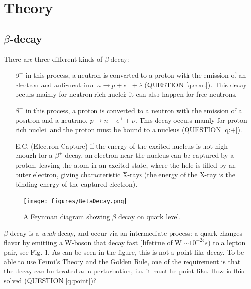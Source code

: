 \documentclass[a4,11pt, notitlepage]{article}
\begin{document}
\section{Theory}
\subsection{$\beta$-decay}

There are three different kinds of $\beta$ decay:
\begin{itemize}
\item[$\beta^-$] in this process, a neutron is converted to a proton with the emission of an electron and anti-neutrino, $n\rightarrow p + e^- + \bar \nu$ (QUESTION \ref{q:cont}). This decay occurs mainly for neutron rich nuclei; it can also happen for free neutrons.
\item[$\beta^+$] in this process, a proton is converted to a neutron with the emission of a positron and a neutrino, $p\rightarrow n + e^+ + \bar \nu$. This decay occurs mainly for proton rich nuclei, and the proton must be bound to a nucleus (QUESTION \ref{q:+}).
\item[E.C.] (Electron Capture) if the energy of the excited nucleus is not high enough for a $\beta^{\pm}$ decay, an electron near the nucleus can be captured by a proton, leaving the atom in an excited state, where the hole is filled by an outer electron, giving characteristic X-rays (the energy of the X-ray is the binding energy of the captured electron).
\end{itemize}

\begin{figure}[htp]
  \vspace{40pt}
  \begin{center}
    \texttt{[image: figures/BetaDecay.png]}
    \caption{A Feynman diagram showing $\beta$ decay on quark level.}
    \label{fig:quark}
  \end{center}
\end{figure}
$\beta$ decay is a \textit{weak} decay, and occur via an intermediate process: a quark changes flavor by emitting a W-boson that decay fast (lifetime of W $\sim 10^{-24}s$) to a lepton pair, see Fig. \ref{fig:quark}. As can be seen in the figure, this is not a point like decay. To be able to use Fermi's Theory and the Golden Rule, one of the requirement is that the decay can be treated as a perturbation, i.e. it must be point like. How is this solved (QUESTION \ref{q:point})? 
\end{document}
